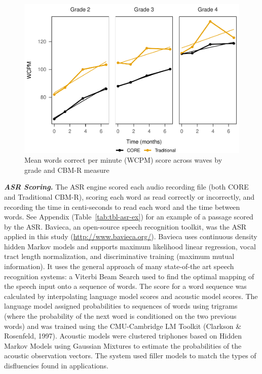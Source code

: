 \documentclass[
  english,
  man, fleqn, noextraspace]{apa6}
\begin{document}
\begin{center}
\begin{ThreePartTable}
\end{ThreePartTable}
\end{center}



\begin{figure}
\centering
\includegraphics{conseq_validity_manusript_files/figure-latex/fig-means-1.pdf}
\caption{\label{fig:fig-means}Mean words correct per minute (WCPM) score across waves by grade and CBM-R measure}
\end{figure}

\textbf{\emph{ASR Scoring.}} The ASR engine scored each audio recording file (both CORE and Traditional CBM-R), scoring each word as read correctly or incorrectly, and recording the time in centi-seconds to read each word and the time between words. See Appendix (Table~\ref{tab:tbl-asr-ex}) for an example of a passage scored by the ASR. Bavieca, an open-source speech recognition toolkit, was the ASR applied in this study (\url{http://www.bavieca.org/}). Bavieca uses continuous density hidden Markov models and supports maximum likelihood linear regression, vocal tract length normalization, and discriminative training (maximum mutual information). It uses the general approach of many state-of-the art speech recognition systems: a Viterbi Beam Search used to find the optimal mapping of the speech input onto a sequence of words. The score for a word sequence was calculated by interpolating language model scores and acoustic model scores. The language model assigned probabilities to sequences of words using trigrams (where the probability of the next word is conditioned on the two previous words) and was trained using the CMU-Cambridge LM Toolkit (Clarkson \& Rosenfeld, 1997). Acoustic models were clustered triphones based on Hidden Markov Models using Gaussian Mixtures to estimate the probabilities of the acoustic observation vectors. The system used filler models to match the types of disfluencies found in applications.
\end{document}
